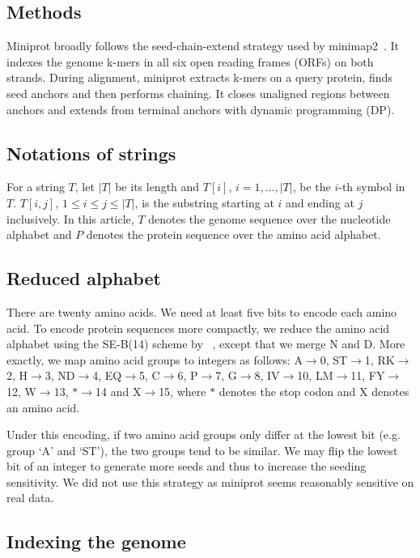 \documentclass{bioinfo}
\begin{document}
\begin{methods}
\section{Methods}

Miniprot broadly follows the seed-chain-extend strategy used by
minimap2~\citep{Li:2018ab}. It indexes the genome k-mers
in all six open reading frames (ORFs) on both
strands. During alignment, miniprot extracts k-mers on a query protein,
finds seed anchors and then performs chaining. It closes
unaligned regions between anchors and extends from terminal anchors with
dynamic programming (DP).

\subsection{Notations of strings}

For a string $T$, let $|T|$ be its length and $T[i]$, $i=1,\ldots,|T|$, be
the $i$-th symbol in $T$. $T[i,j]$, $1\le i\le j\le|T|$, is the substring
starting at $i$ and ending at $j$ inclusively. In this article, $T$ denotes the
genome sequence over the nucleotide alphabet and $P$ denotes the protein
sequence over the amino acid alphabet.

\subsection{Reduced alphabet}

There are twenty amino acids. We need at least five bits to encode each amino
acid. To encode protein sequences more compactly, we reduce the amino acid
alphabet using the SE-B(14) scheme by ~\citet{Edgar:2004aa}, except that we
merge N and D. More exactly, we map amino acid groups to integers as
follows: A$\to$0, ST$\to$1, RK$\to$2, H$\to$3, ND$\to$4, EQ$\to$5, C$\to$6,
P$\to$7, G$\to$8, IV$\to$10, LM$\to$11, FY$\to$12, W$\to$13, $\ast$$\to$14 and
X$\to$15, where $\ast$ denotes the stop codon and X denotes an amino acid.

Under this encoding, if two amino acid groups only differ at the lowest bit
(e.g. group `A' and `ST'), the two groups tend to be similar. We may flip the
lowest bit of an integer to generate more seeds and thus to increase the
seeding sensitivity. We did not use this strategy as miniprot seems reasonably
sensitive on real data.

\subsection{Indexing the genome}


\end{methods}
\end{document}

